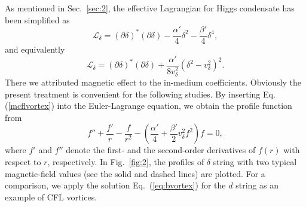 \documentclass[prd, showpacs,nofootinbib,amsmath,amssymb]{revtex4}
\begin{document}
As mentioned in Sec.~\ref{sec:2}, the effective Lagrangian for Higgs condensate has been simplified as 
\begin{equation}
\label{eq:mcflvorticehamilton}
 \mathcal{L}_\delta = (\partial \delta)^* (\partial \delta) - \frac{\alpha'}{4}\delta^2 - \frac{\beta'}{4}\delta^4,
\end{equation}
and equivalently
\begin{equation}
  \label{eq:vortond}
  \mathcal{L}_\delta = (\partial \delta)^* (\partial \delta) + \frac{\alpha'}{8 v_\delta^2}(\delta^2 - v_\delta^2)^2.
\end{equation}
There we attributed magnetic effect to the in-medium coefficients.
Obviously the present treatment is convenient for the following studies.
By inserting Eq.(\ref{mcflvortex}) into the Euler-Lagrange equation, we obtain the profile function from
\begin{equation}
\label{eq:profilefunction}
 f'' + \frac{f'}{r} -\frac{f}{r^2} - (\frac{\alpha'}{4} + \frac{\beta'}{2} v_\delta^2 f^2)f=0,
\end{equation}
where $f'$ and $f''$ denote the first- and the second-order derivatives of $f(r)$ with respect to $r$,
respectively. 
In Fig.~\ref{fig:2}, the profiles of $\delta$ string with two typical magnetic-field values (see the
solid and dashed lines) are plotted. 
For a comparison, we apply the solution Eq.~(\ref{eq:bvortex}) for the $d$ string 
as an example of CFL vortices.
\end{document}
